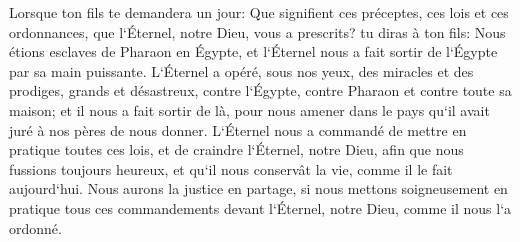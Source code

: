 \verse Lorsque ton fils te demandera un jour: Que signifient ces préceptes, ces lois et ces ordonnances, que l`Éternel, notre Dieu, vous a prescrits? 
\verse tu diras à ton fils: Nous étions esclaves de Pharaon en Égypte, et l`Éternel nous a fait sortir de l`Égypte par sa main puissante. 
\verse L`Éternel a opéré, sous nos yeux, des miracles et des prodiges, grands et désastreux, contre l`Égypte, contre Pharaon et contre toute sa maison; 
\verse et il nous a fait sortir de là, pour nous amener dans le pays qu`il avait juré à nos pères de nous donner. 
\verse L`Éternel nous a commandé de mettre en pratique toutes ces lois, et de craindre l`Éternel, notre Dieu, afin que nous fussions toujours heureux, et qu`il nous conservât la vie, comme il le fait aujourd`hui. 
\verse Nous aurons la justice en partage, si nous mettons soigneusement en pratique tous ces commandements devant l`Éternel, notre Dieu, comme il nous l`a ordonné. 

\chapter{}

